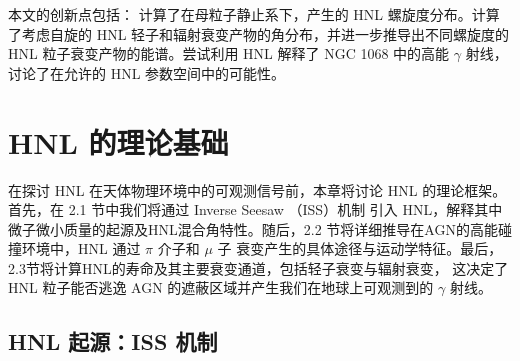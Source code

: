 \documentclass[UTF8]{ctexart}
\begin{document}
本文的创新点包括：
计算了在母粒子静止系下，产生的 HNL 螺旋度分布。计算了考虑自旋的 HNL 轻子和辐射衰变产物的角分布，并进一步推导出不同螺旋度的 HNL
粒子衰变产物的能谱。尝试利用 HNL 解释了 NGC 1068 中的高能 $\gamma$ 射线，讨论了在允许的 HNL 参数空间中的可能性。

\newpage
\section{HNL 的理论基础}
在探讨 HNL 在天体物理环境中的可观测信号前，本章将讨论 HNL 的理论框架。首先，在 2.1 节中我们将通过 Inverse Seesaw （ISS）机制
引入 HNL，解释其中微子微小质量的起源及HNL混合角特性。随后，2.2 节将详细推导在AGN的高能碰撞环境中，HNL 通过 $\pi$ 介子和 $\mu$ 子
衰变产生的具体途径与运动学特征。最后，2.3节将计算HNL的寿命及其主要衰变通道，包括轻子衰变与辐射衰变，
这决定了 HNL 粒子能否逃逸 AGN 的遮蔽区域并产生我们在地球上可观测到的 $\gamma$ 射线。

\subsection{HNL 起源：ISS 机制}
\end{document}
